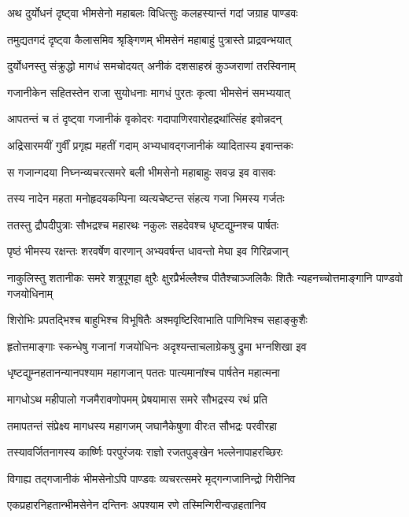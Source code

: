 \twolineshloka
{अथ दुर्योधनं दृष्ट्वा भीमसेनो महाबलः}
{विधित्सुः कलहस्यान्तं गदां जग्राह पाण्डवः}


\twolineshloka
{तमुद्यतगदं दृष्ट्वा कैलासमिव श्रृङ्गिणम्}
{भीमसेनं महाबाहुं पुत्रास्ते प्राद्रवन्भयात्}


\twolineshloka
{दुर्योधनस्तु संक्रुद्धो मागधं समचोदयत्}
{अनीकं दशसाहस्रं कुञ्जराणां तरस्विनाम्}


\twolineshloka
{गजानीकेन सहितस्तेन राजा सुयोधनाः}
{मागधं पुरतः कृत्वा भीमसेनं समभ्ययात्}


\twolineshloka
{आपतन्तं च तं दृष्ट्वा गजानीकं वृकोदरः}
{गदापाणिरवारोहद्रथांत्सिंह इवोन्नदन्}


\twolineshloka
{अद्रिसारमयीं गुर्वीं प्रगृह्य महतीं गदाम्}
{अभ्यधावद्गजानीकं व्यादितास्य इवान्तकः}


\twolineshloka
{स गजान्गदया निघ्नन्व्यचरत्समरे बली}
{भीमसेनो महाबाहुः सवज्र इव वासवः}


\twolineshloka
{तस्य नादेन महता मनोहृदयकम्पिना}
{व्यत्यचेष्टन्त संहत्य गजा भिमस्य गर्जतः}


\twolineshloka
{ततस्तु द्रौपदीपुत्राः सौभद्रश्च महारथः}
{नकुलः सहदेवश्च धृष्टद्युम्नश्च पार्षतः}


\twolineshloka
{पृष्ठं भीमस्य रक्षन्तः शरवर्षेण वारणान्}
{अभ्यवर्षन्त धावन्तो मेघा इव गिरिव्रजान्}


\threelineshloka
{नाकुलिस्तु शतानीकः समरे शत्रुपूगहा}
{क्षुरैः क्षुरप्रैर्भल्लैश्च पीतैश्चाञ्जलिकैः शितैः}
{न्यहनच्चोत्तमाङ्गानि पाण्डवो गजयोधिनाम्}


\twolineshloka
{शिरोभिः प्रपतद्भिश्च बाहुभिश्च विभूषितैः}
{अश्मवृष्टिरिवाभाति पाणिभिश्च सहाङ्कुशैः}


\twolineshloka
{हृतोत्तमाङ्गाः स्कन्धेषु गजानां गजयोधिनः}
{अदृश्यन्ताचलाग्रेकषु द्रुमा भग्नशिखा इव}


\twolineshloka
{धृष्टद्युम्नहतानन्यानपश्याम महागजान्}
{पततः पात्यमानांश्च पार्षतेन महात्मना}


\twolineshloka
{मागधोऽथ महीपालो गजमैरावणोपमम्}
{प्रेषयामास समरे सौभद्रस्य रथं प्रति}


\twolineshloka
{तमापतन्तं संप्रेक्ष्य मागधस्य महागजम्}
{जघानैकेषुणा वीरःत सौभद्रः परवीरहा}


\twolineshloka
{तस्यावर्जितनागस्य कार्ष्णिः परपुरंजयः}
{राज्ञो रजतपुङ्खेन भल्लेनापाहरच्छिरः}


\twolineshloka
{विगाह्य तद्गजानीकं भीमसेनोऽपि पाण्डवः}
{व्यचरत्समरे मृद्गन्गजानिन्द्रो गिरीनिव}


\twolineshloka
{एकप्रहारनिहतान्भीमसेनेन दन्तिनः}
{अपश्याम रणे तस्मिन्गिरीन्वज्रहतानिव}


